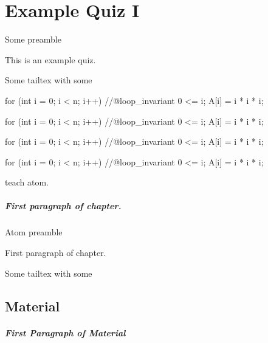 \chapter[100]{Example Quiz I}
\label{ch:quiz-ii}

Some preamble \somecommand

\begin{preamble}
This is an example quiz.
\end{preamble}
Some tailtex with some \command

\begin{code}
  for (int i = 0; i < n; i++)  
  //@loop_invariant 0 <= i;  
  {  
    A[i] = i * i * i;  
  }  
\end{code}

\begin{code}[language=cnot, numbers=none, firstline = 100, lastline = 1001]
  for (int i = 0; i < n; i++)  
  //@loop_invariant 0 <= i;  
  {  
    A[i] = i * i * i;  
  }  
\end{code}

\begin{code}[language=cnot, numbers=left, firstline = 100, lastline = 1002]
  for (int i = 0; i < n; i++)  
  //@loop_invariant 0 <= i;  
  {  
    A[i] = i * i * i;  
  }  
\end{code}


\begin{code}[title = some cnut code, numbers = left, language=cnot, firstline = 100, lastline = 1003]
  for (int i = 0; i < n; i++)  
  //@loop_invariant 0 <= i;  
  {  
    A[i] = i * i * i;  
  }  
\end{code}

\begin{teachask}
teach atom.
\end{teachask}

\paragraph{First paragraph of chapter.}

Atom preamble
\begin{gram}
First paragraph of chapter.
\end{gram}
Some tailtex with some \command
\newpage

\section{Material}

\paragraph{First Paragraph of Material}

